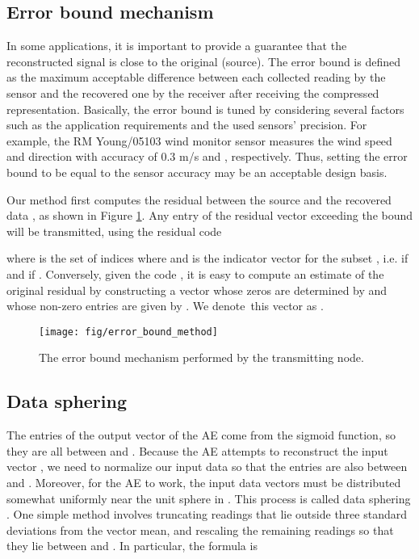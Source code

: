 \documentclass[a4paper,onecolumn,conference]{IEEEtran}
\begin{document}
\subsection{Error bound mechanism}
In some applications, it is important to provide a guarantee that the reconstructed signal is close to the original (source). The error bound  is defined as the maximum acceptable difference between each collected reading by the sensor and the recovered one by the receiver after receiving the compressed representation. Basically, the error bound is tuned by considering several factors such as the application requirements and the used sensors' precision. For example, the RM Young/05103 wind monitor sensor \cite{rm_young05103} measures the wind speed and direction with accuracy of 0.3 m/s and , respectively. Thus, setting
the error bound to be equal to the sensor accuracy may be an acceptable design basis.

Our method first computes the residual  between the source  and the recovered data , as shown in Figure \ref{fig:error_bound}. Any entry of the residual vector exceeding the bound  will be transmitted, using the residual code

where  is the set of indices  where  and  is the indicator vector for the subset , i.e.  if  and  if . Conversely, given the code , it is easy to compute an estimate of the original residual by constructing a vector whose zeros are determined by  and whose non-zero entries are given by . We denote~this vector as .

\begin{figure}
\begin{centering}
\texttt{[image: fig/error\_bound\_method]}
\par\end{centering}

\caption{\label{fig:error_bound}The error bound mechanism performed by the transmitting node.}
\end{figure}

\subsection{Data sphering}
The entries of the output vector  of the AE come from the sigmoid function, so they are all between  and . Because the AE attempts to reconstruct the input vector , we need to normalize our input data so that the entries are also between  and . Moreover, for the AE to work, the input data vectors must be distributed somewhat uniformly near the unit sphere in . This process is called data sphering \cite{ng2011sparse}. One simple method involves truncating readings that lie outside three standard deviations from the vector mean, and rescaling the remaining readings so that they lie between  and . In particular, the formula is
\end{document}
